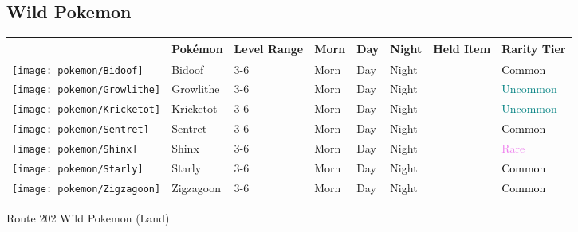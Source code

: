 \subsection{Wild Pokemon}%
\label{subsec:WildPokemon}%
\begin{longtable}{||l l l l l l l l||}%
\hline%
&Pokémon&Level Range&Morn&Day&Night&Held Item&Rarity Tier\\%
\hline%
\endhead%
\hline%
\texttt{[image: pokemon/Bidoof]}&Bidoof&3{-}6&Morn&Day&Night&&\textcolor{black}{%
Common%
}\\%
\hline%
\texttt{[image: pokemon/Growlithe]}&Growlithe&3{-}6&Morn&Day&Night&&\textcolor{teal}{%
Uncommon%
}\\%
\hline%
\texttt{[image: pokemon/Kricketot]}&Kricketot&3{-}6&Morn&Day&Night&&\textcolor{teal}{%
Uncommon%
}\\%
\hline%
\texttt{[image: pokemon/Sentret]}&Sentret&3{-}6&Morn&Day&Night&&\textcolor{black}{%
Common%
}\\%
\hline%
\texttt{[image: pokemon/Shinx]}&Shinx&3{-}6&Morn&Day&Night&&\textcolor{violet}{%
Rare%
}\\%
\hline%
\texttt{[image: pokemon/Starly]}&Starly&3{-}6&Morn&Day&Night&&\textcolor{black}{%
Common%
}\\%
\hline%
\texttt{[image: pokemon/Zigzagoon]}&Zigzagoon&3{-}6&Morn&Day&Night&&\textcolor{black}{%
Common%
}\\%
\hline%
\end{longtable}%
\caption{Route 202 Wild Pokemon (Land)}